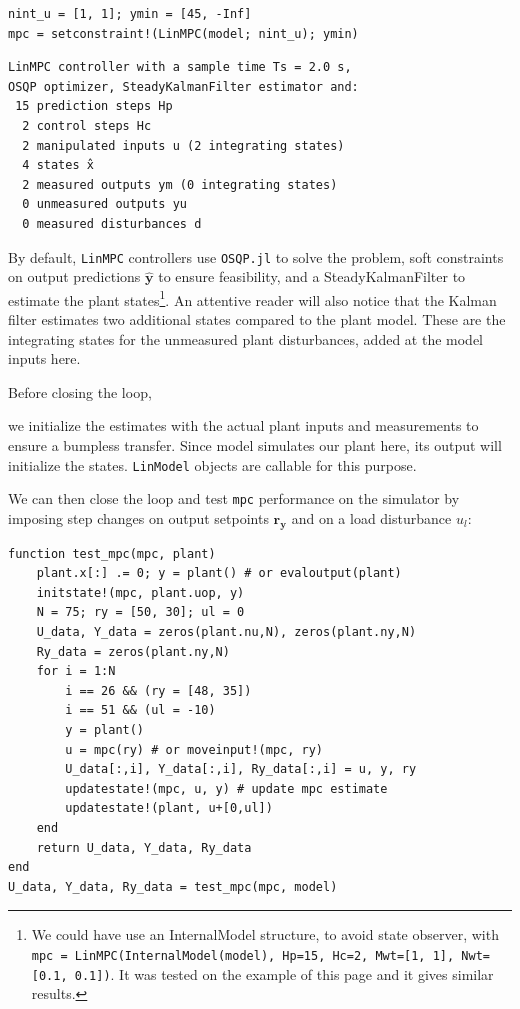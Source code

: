 \begin{verbatim}
nint_u = [1, 1]; ymin = [45, -Inf]
mpc = setconstraint!(LinMPC(model; nint_u); ymin)
\end{verbatim}
\vspace{-25pt}
\begin{verbatim}
LinMPC controller with a sample time Ts = 2.0 s,
OSQP optimizer, SteadyKalmanFilter estimator and:
 15 prediction steps Hp
  2 control steps Hc
  2 manipulated inputs u (2 integrating states)
  4 states x̂
  2 measured outputs ym (0 integrating states)
  0 unmeasured outputs yu
  0 measured disturbances d
\end{verbatim}

By default, \texttt{LinMPC} controllers use \texttt{OSQP.jl} to solve the problem, soft constraints on output predictions $\mathbf{\hat y}$ to ensure feasibility, and a SteadyKalmanFilter to estimate the plant states\footnote{We could have use an InternalModel structure, to avoid state observer, with \texttt{mpc = LinMPC(InternalModel(model), Hp=15, Hc=2, Mwt=[1, 1], Nwt=[0.1, 0.1])}. It was tested on the example of this page and it gives similar results.}. An attentive reader will also notice that the Kalman filter estimates two additional states compared to the plant model. These are the integrating states for the unmeasured plant disturbances, added at the model inputs here.  

Before closing the loop, 

we initialize the estimates with the actual plant inputs and measurements to ensure a bumpless transfer. Since model simulates our plant here, its output will initialize the states. \texttt{LinModel} objects are callable for this purpose. 

We can then close the loop and test \texttt{mpc} performance on the simulator by imposing step changes on output setpoints $\mathbf{r_y}$ and on a load disturbance $u_l$:

\begin{verbatim}
function test_mpc(mpc, plant)
    plant.x[:] .= 0; y = plant() # or evaloutput(plant)
    initstate!(mpc, plant.uop, y)
    N = 75; ry = [50, 30]; ul = 0
    U_data, Y_data = zeros(plant.nu,N), zeros(plant.ny,N)
    Ry_data = zeros(plant.ny,N)
    for i = 1:N
        i == 26 && (ry = [48, 35])
        i == 51 && (ul = -10)
        y = plant() 
        u = mpc(ry) # or moveinput!(mpc, ry)
        U_data[:,i], Y_data[:,i], Ry_data[:,i] = u, y, ry
        updatestate!(mpc, u, y) # update mpc estimate
        updatestate!(plant, u+[0,ul])
    end
    return U_data, Y_data, Ry_data
end
U_data, Y_data, Ry_data = test_mpc(mpc, model)
\end{verbatim}

